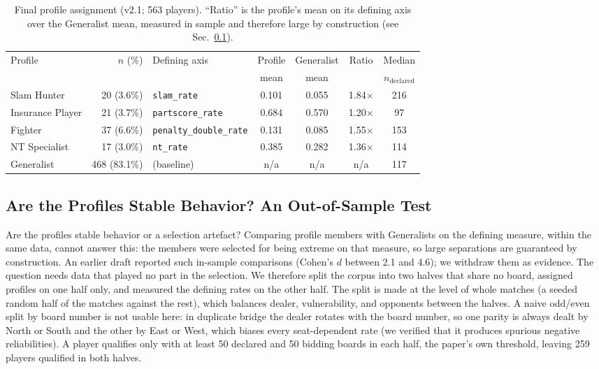 \documentclass[runningheads]{llncs}
\begin{document}
\begin{table}[h]
\centering\small
\caption{Final profile assignment (v2.1; 563 players). ``Ratio'' is the
profile's mean on its defining axis over the Generalist mean, measured
in sample and therefore large by construction (see
Sec.~\ref{sec:validation}).}
\label{tab:profiles}
\begin{tabular}{lrlcccc}
\toprule
Profile & $n$ (\%) & Defining axis & Profile & Generalist & Ratio & Median\\
 & & & mean & mean & & $n_{\mathrm{declared}}$\\
\midrule
Slam Hunter      & 20 (3.6\%) & \texttt{slam\_rate}           & 0.101 & 0.055 & 1.84$\times$ & 216\\
Insurance Player & 21 (3.7\%) & \texttt{partscore\_rate}      & 0.684 & 0.570 & 1.20$\times$ & 97\\
Fighter          & 37 (6.6\%) & \texttt{penalty\_double\_rate}& 0.131 & 0.085 & 1.55$\times$ & 153\\
NT Specialist    & 17 (3.0\%) & \texttt{nt\_rate}             & 0.385 & 0.282 & 1.36$\times$ & 114\\
Generalist       & 468 (83.1\%) & (baseline) & n/a & n/a & n/a & 117\\
\bottomrule
\end{tabular}
\end{table}

\subsection{Are the Profiles Stable Behavior? An Out-of-Sample Test}\label{sec:validation}

Are the profiles stable behavior or a selection artefact? Comparing
profile members with Generalists on the defining measure, within the
same data, cannot answer this: the members were selected for being
extreme on that measure, so large separations are guaranteed by
construction. An earlier draft reported such in-sample comparisons
(Cohen's $d$ between 2.1 and 4.6); we withdraw them as evidence. The
question needs data that played no part in the selection. We therefore
split the corpus into two halves that share no board, assigned
profiles on one half only, and measured the defining rates on the
other half. The split is made at the level of whole matches (a seeded
random half of the matches against the rest), which balances dealer,
vulnerability, and opponents between the halves. A naive odd/even
split by board number is not usable here: in duplicate bridge the
dealer rotates with the board number, so one parity is always dealt by
North or South and the other by East or West, which biases every
seat-dependent rate (we verified that it produces spurious negative
reliabilities). A player qualifies only with at least 50 declared and
50 bidding boards in each half, the paper's own threshold, leaving 259
players qualified in both halves.
\end{document}
